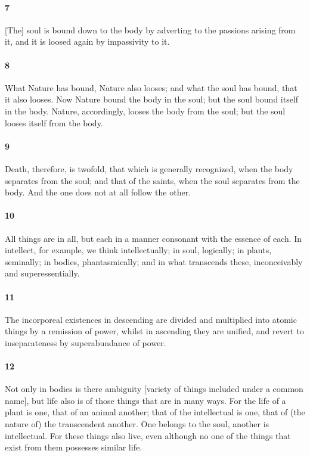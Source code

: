 \documentclass[12pt]{article}
\begin{document}
\paragraph{7} [The] soul is bound down to the body by adverting to the passions
arising from it, and it is loosed again by impassivity to it.

\paragraph{8} What Nature has bound, Nature also looses; and what the soul has
bound, that it also looses. Now Nature bound the body in the soul; but the soul
bound itself in the body. Nature, accordingly, looses the body from the soul;
but the soul looses itself from the body.

\paragraph{9} Death, therefore, is twofold, that which is generally recognized,
when the body separates from the soul; and that of the saints, when the soul
separates from the body. And the one does not at all follow the other.

\paragraph{10} All things are in all, but each in a manner consonant with the
es\-sence of each. In intellect, for example, we think intellectually; in soul,
logically; in plants, seminally; in bodies, phantasmically; and in what
transcends these, inconceivably and superessentially.

\paragraph{11} The incorporeal existences in descending are divided and
multiplied into atomic things by a remission of power, whilst in ascending they
are unified, and revert to inseparateness by superabundance of power.

\paragraph{12} Not only in bodies is there ambiguity [variety of things
included under a common name], but life also is of those things that are in
many ways. For the life of a plant is one, that of an animal another; that of
the intellectual is one, that of (the nature of) the transcendent another. One
belongs to the soul, another is intellectual. For these things also live, even
although no one of the things that exist from them possesses similar life.
\end{document}
